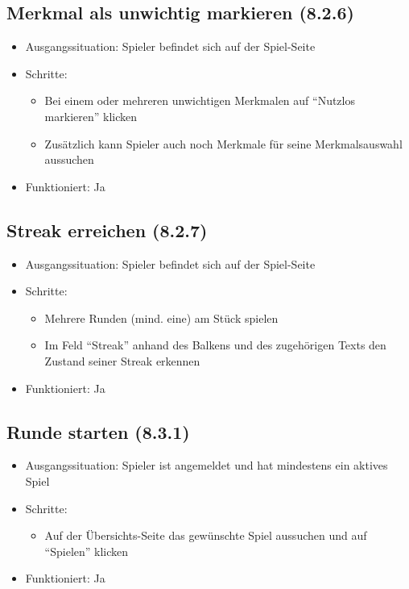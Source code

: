 \documentclass[a4paper]{scrreprt}
\begin{document}
            \subsection{Merkmal als unwichtig markieren (8.2.6)}
            \begin{itemize}
                \item Ausgangssituation: Spieler befindet sich auf der Spiel-Seite
                \item Schritte:
                    \begin{itemize}
                        \item Bei einem oder mehreren unwichtigen Merkmalen auf \enquote{Nutzlos markieren} klicken
                        \item Zusätzlich kann Spieler auch noch Merkmale für seine Merkmalsauswahl aussuchen
                    \end{itemize}
                \item Funktioniert: Ja
            \end{itemize}

            \subsection{Streak erreichen (8.2.7)}
            \begin{itemize}
                \item Ausgangssituation: Spieler befindet sich auf der Spiel-Seite
                \item Schritte:
                    \begin{itemize}
                        \item Mehrere Runden (mind. eine) am Stück spielen
                        \item Im Feld \enquote{Streak} anhand des Balkens und des zugehörigen Texts den Zustand seiner Streak erkennen
                    \end{itemize}
                    \item Funktioniert: Ja
            \end{itemize}

            \subsection{Runde starten (8.3.1)}
            \begin{itemize}
                \item Ausgangssituation: Spieler ist angemeldet und hat mindestens ein aktives Spiel
                \item Schritte:
                    \begin{itemize}
                        \item Auf der Übersichts-Seite das gewünschte Spiel aussuchen und auf \enquote{Spielen} klicken
                    \end{itemize}
                \item Funktioniert: Ja
            \end{itemize}
\end{document}
